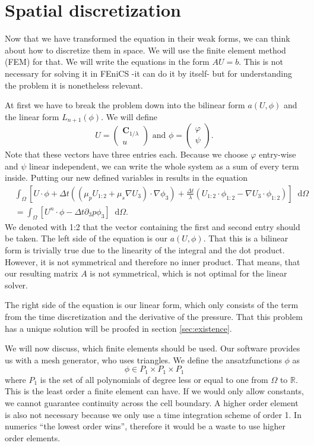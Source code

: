 \documentclass[12pt,a4paper,twoside, open=right]{scrreprt}
\theoremstyle{definition}
\theoremstyle{plain}
\newcommand{\rr}{\mathbb{R}}
\newcommand{\bfC}{\bm{C}}
\newcommand{\D}{\mathop{}\!\mathrm{d}}
\begin{document}
\section{Spatial discretization}
Now that we have transformed the equation in their weak forms, we can think about how to discretize them in space. We will use the finite element method (FEM) for that. We will write the equations in the form $AU=b$. This is not necessary for solving it in FEniCS -it can do it by itself- but for understanding the problem it is nonetheless relevant. 
\par 
At first we have to break the problem down into the bilinear form $a(U,\phi)$ and the linear form $L_{n+1}(\phi)$. We will define 
\begin{equation}
   U=\begin{pmatrix}
   \bfC_{1/\lambda}\\u
   \end{pmatrix} \text{ and } 
   \phi=\begin{pmatrix}
   \varphi\\\psi
   \end{pmatrix}.
\end{equation}
Note that these vectors have three entries each. Because we choose $\varphi$ entry-wise and $\psi$ linear independent, we can write the whole system as a sum of every term inside. Putting our new defined variables in results in the equation
\begin{align}
    &\int_\Omega[U\cdot\phi+\Delta t((\mu_pU_{1:2}+\mu_s\nabla U_3)\cdot\nabla\phi_3)+\frac{\Delta t}{\lambda}(U_{1:2}\cdot\phi_{1:2}-\nabla U_3\cdot\phi_{1:2})]\D\Omega\\
    &=\int_\Omega [U^n\cdot\phi-\Delta t\partial_3 p\phi_3]\D\Omega.
\end{align}
We denoted with 1:2 that the vector containing the first and second entry should be taken. The left side of the equation is our $a(U,\phi)$. That this is a bilinear form is trivially true due to the linearity of the integral and the dot product. However, it is not symmetrical and therefore no inner product. That means, that our resulting matrix $A$ is not symmetrical, which is not optimal for the linear solver.\par 
The right side of the equation is our linear form, which only consists of the term from the time discretization and the derivative of the pressure. That this problem has a unique solution will be proofed in section \ref{sec:existence}. \par 
We will now discuss, which finite elements should be used. Our software provides us with a mesh generator, who uses triangles. We define the ansatzfunctions $\phi$ as
\begin{equation}
    \phi\in P_1\times P_1\times P_1
\end{equation}
where $P_1$ is the set of all polynomials of degree less or equal to one from $\Omega$ to $\rr$. This is the least order a finite element can have. If we would only allow constants, we cannot guarantee continuity across the cell boundary. A higher order element is also not necessary because we only use a time integration scheme of order 1. In numerics \enquote{the lowest order wins}, therefore it would be a waste to use higher order elements.
\end{document}
